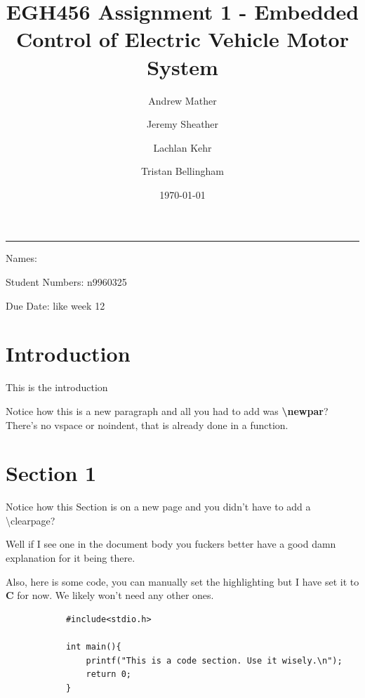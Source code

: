 \documentclass{article}
\title{EGH456 Assignment 1 - Embedded Control of Electric Vehicle Motor System}
\author{Andrew Mather\and Jeremy Sheather\and Lachlan Kehr\and Tristan Bellingham}
\date{\today}
\newcommand{\newpar}{\vspace{5mm}\noindent}
\newcommand{\studentnumbers}{n9960325} %
\begin{document}
    \begin{titlepage}
		\centering
		\rule{\textwidth}{1pt}
		\vspace{5mm}

		{\huge\thetitle}

		\vspace{20mm}

		{\Large Names: \theauthor}

		{\Large Student Numbers: \studentnumbers}

		\vspace{5mm}

		{\large Due Date: like week 12} %
		
		\vspace{5mm}

		\vspace*{\fill} 
    \end{titlepage}

    \tableofcontents

    \section{Introduction}
        This is the introduction

        \newpar Notice how this is a new paragraph and all you had to add was \textbf{\textbackslash newpar}? There's no vspace or noindent, that is already done in a function.



    \section{Section 1}
        Notice how this Section is on a new page and you didn't have to add a \textbackslash clearpage?

        \newpar Well if I see one in the document body you fuckers better have a good damn explanation for it being there.

        \newpar Also, here is some code, you can manually set the highlighting but I have set it to \textbf{C} for now. We likely won't need any other ones.

        \begin{lstlisting}
            #include<stdio.h>

            int main(){
                printf("This is a code section. Use it wisely.\n");
                return 0;
            }
        \end{lstlisting}
\end{document}

